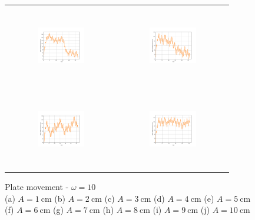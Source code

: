 \begin{figure}[H]
\begin{center}
\begin{tabular}{cc}
\includegraphics[width=0.45\textwidth, height=3.5cm]{graph/omega=3.00_A=7_plate.pdf}
&
\includegraphics[width=0.45\textwidth, height=3.5cm]{graph/omega=3.00_A=8_plate.pdf}\\
\includegraphics[width=0.45\textwidth, height=3.5cm]{graph/omega=3.00_A=9_plate.pdf}
&
\includegraphics[width=0.45\textwidth, height=3.5cm]{graph/omega=3.00_A=10_plate.pdf}\\
\end{tabular}
\end{center}
\caption{Plate movement - $\omega=10$ \\ (a) $A=1\mathrm{~cm}$ (b) $A=2\mathrm{~cm}$ (c) $A=3\mathrm{~cm}$ (d) $A=4\mathrm{~cm}$ (e) $A=5\mathrm{~cm}$\\(f) $A=6\mathrm{~cm}$ (g) $A=7\mathrm{~cm}$ (h) $A=8\mathrm{~cm}$ (i) $A=9\mathrm{~cm}$ (j) $A=10\mathrm{~cm}$}
\label{Data_omega=10_plate}
\end{figure}

